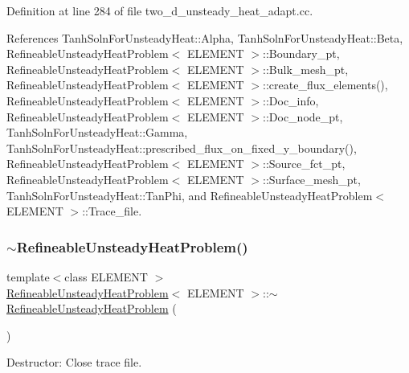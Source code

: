 Definition at line 284 of file two\+\_\+d\+\_\+unsteady\+\_\+heat\+\_\+adapt.\+cc.



References Tanh\+Soln\+For\+Unsteady\+Heat\+::\+Alpha, Tanh\+Soln\+For\+Unsteady\+Heat\+::\+Beta, Refineable\+Unsteady\+Heat\+Problem$<$ E\+L\+E\+M\+E\+N\+T $>$\+::\+Boundary\+\_\+pt, Refineable\+Unsteady\+Heat\+Problem$<$ E\+L\+E\+M\+E\+N\+T $>$\+::\+Bulk\+\_\+mesh\+\_\+pt, Refineable\+Unsteady\+Heat\+Problem$<$ E\+L\+E\+M\+E\+N\+T $>$\+::create\+\_\+flux\+\_\+elements(), Refineable\+Unsteady\+Heat\+Problem$<$ E\+L\+E\+M\+E\+N\+T $>$\+::\+Doc\+\_\+info, Refineable\+Unsteady\+Heat\+Problem$<$ E\+L\+E\+M\+E\+N\+T $>$\+::\+Doc\+\_\+node\+\_\+pt, Tanh\+Soln\+For\+Unsteady\+Heat\+::\+Gamma, Tanh\+Soln\+For\+Unsteady\+Heat\+::prescribed\+\_\+flux\+\_\+on\+\_\+fixed\+\_\+y\+\_\+boundary(), Refineable\+Unsteady\+Heat\+Problem$<$ E\+L\+E\+M\+E\+N\+T $>$\+::\+Source\+\_\+fct\+\_\+pt, Refineable\+Unsteady\+Heat\+Problem$<$ E\+L\+E\+M\+E\+N\+T $>$\+::\+Surface\+\_\+mesh\+\_\+pt, Tanh\+Soln\+For\+Unsteady\+Heat\+::\+Tan\+Phi, and Refineable\+Unsteady\+Heat\+Problem$<$ E\+L\+E\+M\+E\+N\+T $>$\+::\+Trace\+\_\+file.

\mbox{\label{classRefineableUnsteadyHeatProblem_a975e00f5e87d77b4e1bf4d50482dea2b}} 
\subsubsection{\texorpdfstring{$\sim$\+Refineable\+Unsteady\+Heat\+Problem()}{~RefineableUnsteadyHeatProblem()}}
{\footnotesize\ttfamily template$<$class E\+L\+E\+M\+E\+NT $>$ \\
\hyperlink{classRefineableUnsteadyHeatProblem}{Refineable\+Unsteady\+Heat\+Problem}$<$ E\+L\+E\+M\+E\+NT $>$\+::$\sim$\hyperlink{classRefineableUnsteadyHeatProblem}{Refineable\+Unsteady\+Heat\+Problem} (\begin{DoxyParamCaption}{ }\end{DoxyParamCaption})}



Destructor\+: Close trace file. 




